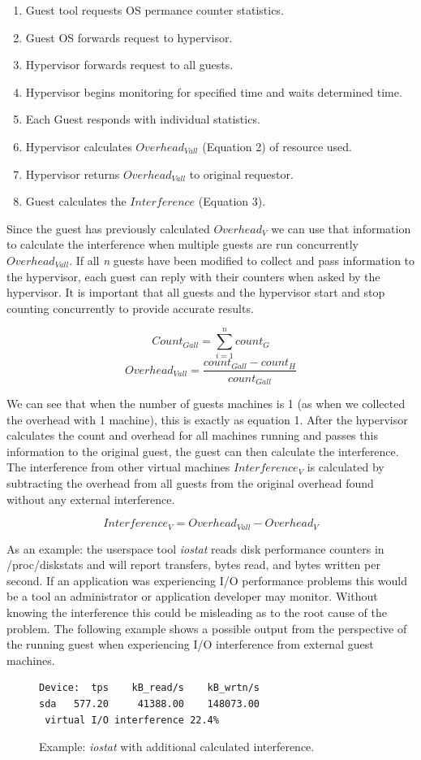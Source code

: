\begin{enumerate}
	\item Guest tool requests OS permance counter statistics.
	\item Guest OS forwards request to hypervisor.
	\item Hypervisor forwards request to all guests.
	\item Hypervisor begins monitoring for specified time and waits determined time.
	\item Each Guest responds with individual statistics.
	\item Hypervisor calculates $Overhead_{Vall}$ (Equation 2) of resource used.
	\item Hypervisor returns $Overhead_{Vall}$ to original requestor.
	\item Guest calculates the $Interference$ (Equation 3).
\end{enumerate}

Since the guest has previously calculated $ Overhead_V $ we can use that information to calculate the interference when multiple guests are run concurrently $ Overhead_{Vall}$.  If all \emph{n} guests have been modified to collect and pass information to the hypervisor, each guest can reply with their counters when asked by the hypervisor.  It is important that all guests and the hypervisor start and stop counting concurrently to provide accurate results.  

\[ Count_{Gall} = \sum_{i=1}^n{count_G} \] 
\begin{equation}
Overhead_{Vall} = \frac{count_{Gall} - count_H}{count_{Gall}} 
\label{eq2}
\end{equation}

\indent We can see that when the number of guests machines is 1 (as when we collected the overhead with 1 machine), this is exactly as equation 1.  After the hypervisor calculates the count and overhead for all machines running and passes this information to the original guest, the guest can then calculate the interference.  
The interference from other virtual machines $Interference_V$ is calculated by subtracting the overhead from all guests from the original overhead found without any external interference. 

\begin{equation}
Interference_V = Overhead_{Vall} - Overhead_V
\label{eq3}
\end{equation}

\indent As an example: the userspace tool \emph{iostat} reads disk performance counters in /proc/diskstats and will report transfers, bytes read, and bytes written per second.  If an application was experiencing I/O performance problems this would be a tool an administrator or application developer may monitor.  Without knowing the interference this could be misleading as to the root cause of the problem.  The following example shows a possible output from the perspective of the running guest when experiencing I/O interference from external guest machines.

\begin{figure}[h]
\begin{Verbatim}
Device:  tps    kB_read/s    kB_wrtn/s
sda   577.20     41388.00    148073.00
 virtual I/O interference 22.4%     
\end{Verbatim}
\label{fig:iostat}
\caption{Example:  \emph{iostat} with additional calculated interference.}
\end{figure}

